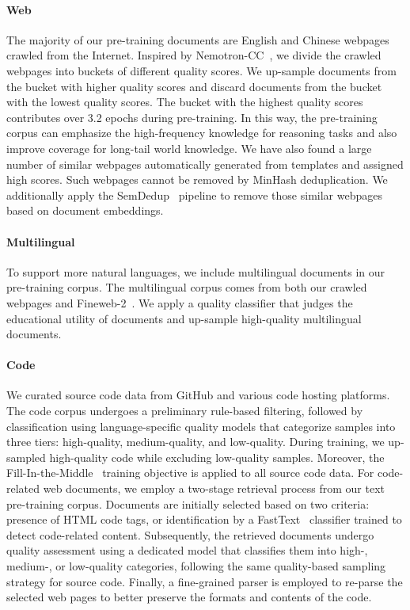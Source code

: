 \paragraph{Web} The majority of our pre-training documents are English and Chinese webpages crawled from the Internet. Inspired by Nemotron-CC~\cite{su2024nemotron}, we divide the crawled webpages into buckets of different quality scores. We up-sample documents from the bucket with higher quality scores
and discard documents from the bucket with the lowest quality scores. The bucket with the highest quality scores contributes over 3.2 epochs during pre-training. In this way, the pre-training corpus can emphasize the high-frequency knowledge for reasoning tasks and also improve coverage for long-tail world knowledge. We have also found a large number of similar webpages automatically generated from templates and assigned high scores. Such webpages cannot be removed by MinHash deduplication. We additionally apply the SemDedup~\cite{abbas2023semdedup} pipeline to remove those similar webpages based on document embeddings.

\paragraph{Multilingual} To support more natural languages, we include multilingual documents in our pre-training corpus. The multilingual corpus comes from both our crawled webpages and Fineweb-2~\cite{penedo2025fineweb2}. We apply a quality classifier that judges the educational utility of documents and up-sample high-quality multilingual documents.

\paragraph{Code} We curated source code data from GitHub and various code hosting platforms. The code corpus undergoes a preliminary rule-based filtering, followed by classification using language-specific quality models that categorize samples into three tiers: high-quality, medium-quality, and low-quality. During training, we up-sampled high-quality code while excluding low-quality samples. Moreover, the Fill-In-the-Middle~\cite{bavarian2022efficienttraininglanguagemodels} training objective is applied to all source code data. 
For code-related web documents, we employ a two-stage retrieval process from our text pre-training corpus. Documents are initially selected based on two criteria: presence of HTML code tags, or identification by a FastText~\citep{joulin2017bag} classifier trained to detect code-related content. Subsequently, the retrieved documents undergo quality assessment using a dedicated model that classifies them into high-, medium-, or low-quality categories, following the same quality-based sampling strategy for source code. Finally, a fine-grained parser is employed to re-parse the selected web pages to better preserve the formats and contents of the code.

